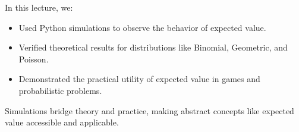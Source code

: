 \documentclass{article}
\begin{document}
In this lecture, we:
\begin{itemize}
  \item Used Python simulations to observe the behavior of expected value.
  \item Verified theoretical results for distributions like Binomial, Geometric, and Poisson.
  \item Demonstrated the practical utility of expected value in games and probabilistic problems.
\end{itemize}

Simulations bridge theory and practice, making abstract concepts like expected value accessible and applicable.
\end{document}

